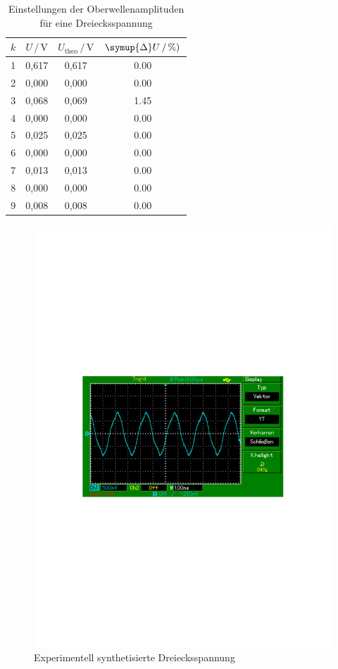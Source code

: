\begin{table}
    \centering
    \caption{Einstellungen der Oberwellenamplituden für eine Dreiecksspannung}
    \label{tab:Messdaten6}
    \begin{tabular}{c c c c}
    \toprule
    $k$ & $U \,/\, \si{\volt}$ & $U_\text{theo} \,/\, \si{\volt}$ & $\symup{\Delta}U \,/\, \si{\percent})$ \\
    \midrule
    1 & 0,617 & 0,617 & 0.00 \\
    2 & 0,000 & 0,000 & 0.00 \\
    3 & 0,068 & 0,069 & 1.45 \\
    4 & 0,000 & 0,000 & 0.00 \\
    5 & 0,025 & 0,025 & 0.00 \\
    6 & 0,000 & 0,000 & 0.00 \\
    7 & 0,013 & 0,013 & 0.00 \\
    8 & 0,000 & 0,000 & 0.00 \\
    9 & 0,008 & 0,008 & 0.00 \\
    \bottomrule
    \end{tabular}
\end{table}

\begin{figure}
    \centering
    \includegraphics[scale=0.7]{content/MAP003.pdf}
    \caption{Experimentell synthetisierte Dreiecksspannung}
    \label{fig:Ex3}
\end{figure}




